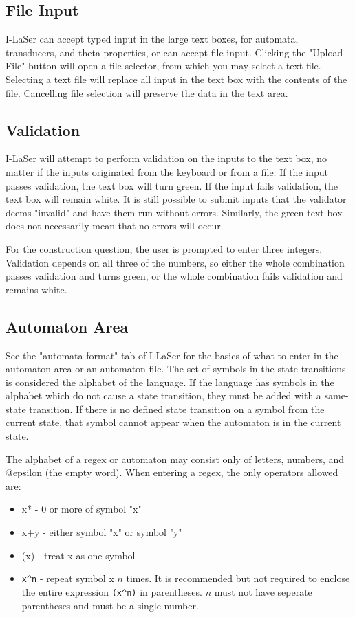 \documentclass{article}
\begin{document}
\subsection{File Input}
I-LaSer can accept typed input in the large text boxes, for automata, transducers, and theta properties, or can accept file input. Clicking the "Upload File" button will open a file selector, from which you may select a text file. Selecting a text file will replace all input in the text box with the contents of the file. Cancelling file selection will preserve the data in the text area.

\subsection{Validation}
I-LaSer will attempt to perform validation on the inputs to the text box, no matter if the inputs originated from the keyboard or from a file. If the input passes validation, the text box will turn green. If the input fails validation, the text box will remain white. It is still possible to submit inputs that the validator deems "invalid" and have them run without errors. Similarly, the green text box does not necessarily mean that no errors will occur. 
\par For the construction question, the user is prompted to enter three integers. Validation depends on all three of the numbers, so either the whole combination passes validation and turns green, or the whole combination fails validation and remains white.

\subsection{Automaton Area}
See the "automata format" tab of I-LaSer for the basics of what to enter in the automaton area or an automaton file. The set of symbols in the state transitions is considered the alphabet of the language. If the language has symbols in the alphabet which do not cause a state transition, they must be added with a same-state transition. If there is no defined state transition on a symbol from the current state, that symbol cannot appear when the automaton is in the current state.

\par The alphabet of a regex or automaton may consist only of letters, numbers, and @epsilon (the empty word).
When entering a regex, the only operators allowed are:
\begin{itemize}
\item x* - 0 or more of symbol "x"
\item x+y - either symbol "x" or symbol "y"
\item (x) - treat x as one symbol
\item \verb-x^n- - repeat symbol x $n$ times. It is recommended but not required to enclose the entire expression \verb-(x^n)- in parentheses. $n$ must not have seperate parentheses and must be a single number. 
\end{itemize}
\end{document}
